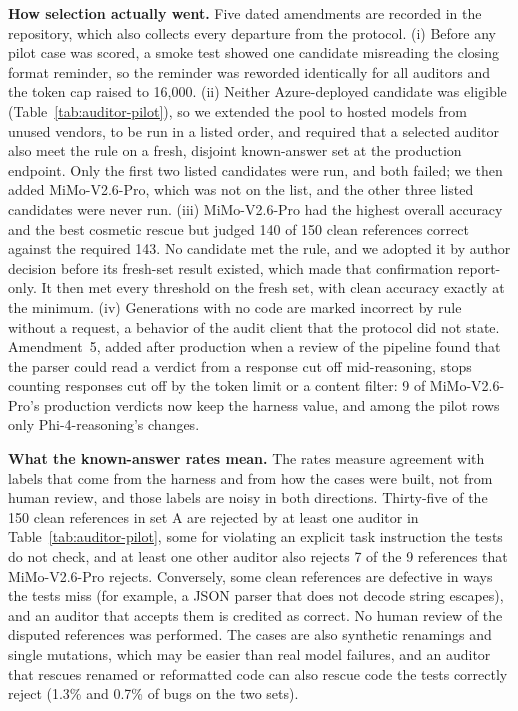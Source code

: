 \documentclass{article}
\begin{document}
\textbf{How selection actually went.} Five dated amendments are recorded in the repository, which also collects every departure from the protocol. (i) Before any pilot case was scored, a smoke test showed one candidate misreading the closing format reminder, so the reminder was reworded identically for all auditors and the token cap raised to 16{,}000. (ii) Neither Azure-deployed candidate was eligible (Table~\ref{tab:auditor-pilot}), so we extended the pool to hosted models from unused vendors, to be run in a listed order, and required that a selected auditor also meet the rule on a fresh, disjoint known-answer set at the production endpoint. Only the first two listed candidates were run, and both failed; we then added MiMo-V2.6-Pro, which was not on the list, and the other three listed candidates were never run. (iii) MiMo-V2.6-Pro had the highest overall accuracy and the best cosmetic rescue but judged 140 of 150 clean references correct against the required 143. No candidate met the rule, and we adopted it by author decision before its fresh-set result existed, which made that confirmation report-only. It then met every threshold on the fresh set, with clean accuracy exactly at the minimum. (iv) Generations with no code are marked incorrect by rule without a request, a behavior of the audit client that the protocol did not state. Amendment~5, added after production when a review of the pipeline found that the parser could read a verdict from a response cut off mid-reasoning, stops counting responses cut off by the token limit or a content filter: 9 of MiMo-V2.6-Pro's production verdicts now keep the harness value, and among the pilot rows only Phi-4-reasoning's changes.

\textbf{What the known-answer rates mean.} The rates measure agreement with labels that come from the harness and from how the cases were built, not from human review, and those labels are noisy in both directions. Thirty-five of the 150 clean references in set A are rejected by at least one auditor in Table~\ref{tab:auditor-pilot}, some for violating an explicit task instruction the tests do not check, and at least one other auditor also rejects 7 of the 9 references that MiMo-V2.6-Pro rejects. Conversely, some clean references are defective in ways the tests miss (for example, a JSON parser that does not decode string escapes), and an auditor that accepts them is credited as correct. No human review of the disputed references was performed. The cases are also synthetic renamings and single mutations, which may be easier than real model failures, and an auditor that rescues renamed or reformatted code can also rescue code the tests correctly reject (1.3\% and 0.7\% of bugs on the two sets).
\end{document}
